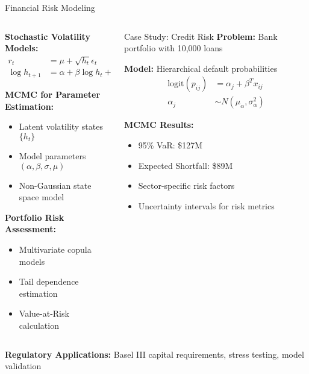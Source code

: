 \documentclass[aspectratio=169,11pt]{beamer}
\begin{document}
\begin{frame}{Financial Risk Modeling}
\begin{columns}
\begin{column}{0.5\textwidth}
\textbf{Stochastic Volatility Models:}
\begin{align}
r_t &= \mu + \sqrt{h_t} \epsilon_t \\
\log h_{t+1} &= \alpha + \beta \log h_t + \sigma \eta_t
\end{align}

\textbf{MCMC for Parameter Estimation:}
\begin{itemize}
\item Latent volatility states $\{h_t\}$
\item Model parameters $(\alpha, \beta, \sigma, \mu)$
\item Non-Gaussian state space model
\end{itemize}

\vspace{0.3cm}
\textbf{Portfolio Risk Assessment:}
\begin{itemize}
\item Multivariate copula models
\item Tail dependence estimation
\item Value-at-Risk calculation
\end{itemize}
\end{column}
\begin{column}{0.5\textwidth}
\begin{block}{Case Study: Credit Risk}
\textbf{Problem:} Bank portfolio with 10,000 loans

\textbf{Model:} Hierarchical default probabilities
\begin{align}
\text{logit}(p_{ij}) &= \alpha_j + \beta^T x_{ij} \\
\alpha_j &\sim N(\mu_\alpha, \sigma^2_\alpha)
\end{align}

\textbf{MCMC Results:}
\begin{itemize}
\item 95\% VaR: \$127M
\item Expected Shortfall: \$89M
\item Sector-specific risk factors
\item Uncertainty intervals for risk metrics
\end{itemize}
\end{block}
\end{column}
\end{columns}

\vspace{0.3cm}
\textbf{Regulatory Applications:} Basel III capital requirements, stress testing, model validation
\end{frame}
\end{document}
